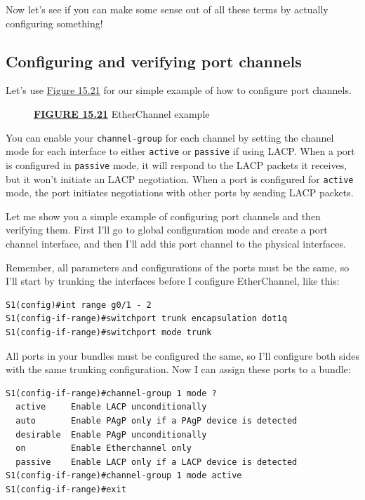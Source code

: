 Now let's see if you can make some sense out of all these terms by
actually configuring something!

\subsection{Configuring and verifying port channels}

Let's use \protect\hyperlink{c15.xhtmlux5cux23figure15-21}{Figure 15.21}
for our simple example of how to configure port channels.

\begin{figure}
\centering
\caption{{\protect\hyperlink{c15.xhtmlux5cux23figureanchor15-21}{\textbf{FIGURE
15.21}} EtherChannel example}}
\end{figure}

You can enable your
\texttt{channel-group} for each channel by setting the channel mode for
each interface to either \texttt{active} or \texttt{passive} if using
LACP. When a port is configured in \texttt{passive} mode, it will
respond to the LACP packets it receives, but it won't initiate an LACP
negotiation. When a port is configured for \texttt{active} mode, the
port initiates negotiations with other ports by sending LACP packets.

Let me show you a simple example of configuring port channels and then
verifying them. First I'll go to global configuration mode and create a
port channel interface, and then I'll add this port channel to the
physical interfaces.

Remember, all parameters and configurations of the ports must be the
same, so I'll start by trunking the interfaces before I configure
EtherChannel, like this:

\begin{verbatim}
S1(config)#int range g0/1 - 2
S1(config-if-range)#switchport trunk encapsulation dot1q
S1(config-if-range)#switchport mode trunk
\end{verbatim}

All ports in your bundles must be configured the same, so I'll configure
both sides with the same trunking configuration. Now I can assign these
ports to a bundle:

\begin{verbatim}
S1(config-if-range)#channel-group 1 mode ?
  active     Enable LACP unconditionally
  auto       Enable PAgP only if a PAgP device is detected
  desirable  Enable PAgP unconditionally
  on         Enable Etherchannel only
  passive    Enable LACP only if a LACP device is detected
S1(config-if-range)#channel-group 1 mode active
S1(config-if-range)#exit
\end{verbatim}

